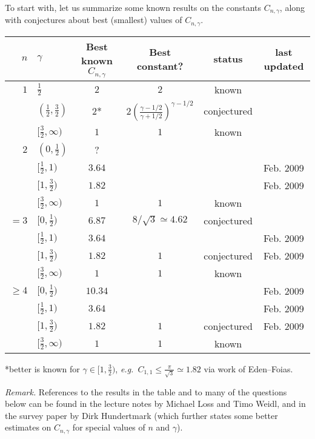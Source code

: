 \documentclass[12pt,letterpaper, reqno]{amsart}
\begin{document}
To start with, let us summarize some known results on the constants
$C_{n,\gamma}$, along with conjectures about best (smallest) values
of $C_{n,\gamma}$.
%
\begin{center}
%
\renewcommand{\arraystretch}{1.3}
\begin{tabular}[h]{|r|l|c|cc|c|}
\hline $n$ & $\gamma$ & Best known $C_{n,\gamma}$ & Best constant? & status & last updated\\
\hline \hline
$1$ & $\frac{1}{2}$ & $2$ & $2$ & known & \\
& $(\frac{1}{2},\frac{3}{2})$ & $2$* & $2 \! \left( \frac{\gamma - 1/2}{\gamma + 1/2} \right)^{\gamma - 1/2}$ & conjectured & \\
& $[\frac{3}{2},\infty)$ & $1$ & $1$ & known & \\
\hline
$2$ & $(0,\frac{1}{2})$ & ? & & &\\
& $[\frac{1}{2},1)$ & $3.64$ & & & Feb. 2009\\
& $[1,\frac{3}{2})$ & $1.82$ & & & Feb. 2009\\
& $[\frac{3}{2},\infty)$ & $1$ & $1$ & known &\\
\hline
$= 3$ & $[0,\frac{1}{2})$ & $6.87$ & $8/\sqrt{3}\simeq 4.62$ & conjectured &\\
& $[\frac{1}{2},1)$ & $3.64$ & & & Feb. 2009\\
& $[1,\frac{3}{2})$ & $1.82$ & $1$ & conjectured & Feb. 2009\\
& $[\frac{3}{2},\infty)$ & $1$ & $1$ & known & \\
\hline
$\geq 4$ & $[0,\frac{1}{2})$ & $10.34$ & & & Feb. 2009\\
& $[\frac{1}{2},1)$ & $3.64$ & & & Feb. 2009\\
& $[1,\frac{3}{2})$ & $1.82$ & $1$ & conjectured & Feb. 2009\\
& $[\frac{3}{2},\infty)$ & $1$ & $1$ & known & \\
\hline
\end{tabular}
%

\hspace*{6pt} *better is known for $\gamma \in [1,\frac{3}{2})$,
\textit{e.g.}\ $C_{1,1} \leq \frac{\pi}{\sqrt{3}} \simeq 1.82$ via
work of Eden--Foias.
\end{center}
%
\noindent \emph{Remark.} References to the results in the table and
to many of the questions below can be found in the lecture notes by
Michael Loss and Timo Weidl, and in the survey paper by Dirk
Hundertmark (which further states some better estimates on
$C_{n,\gamma}$ for special values of $n$ and $\gamma$).
\end{document}
